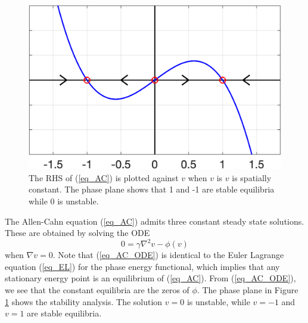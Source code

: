 \documentclass[12pt, reqno]{report}
\theoremstyle{definition}
\theoremstyle{remark}
\begin{document}
\begin{figure}
    \centering
    \vspace{-10pt}
    \includegraphics[width=.3\paperwidth]{media_paper/ACphase.png}
    \caption{The RHS of (\ref{eq_AC}) is plotted against $v$ when $v$ is $v$ is spatially constant. The phase plane shows that 1 and -1 are stable equilibria while 0 is unstable.}
    \label{fg_AC_phase}
\end{figure}
The Allen-Cahn equation (\ref{eq_AC}) admits three constant steady state solutions. These are obtained by solving the ODE 
\begin{equation} \label{eq_AC_ODE}
    0=\gamma\nabla^2v-\phi(v)
\end{equation}
when $\nabla v=0$. 
Note that (\ref{eq_AC_ODE}) is identical to the Euler Lagrange equation (\ref{eq_EL}) for the phase energy functional,
which implies that any stationary energy point is an equilibrium of (\ref{eq_AC}).
From (\ref{eq_AC_ODE}), we see that the constant equilibria are the zeros of $\phi$. 
The phase plane in Figure \ref{fg_AC_phase} shows the stability analysis. 
The solution $v=0$ is unstable, while $v=-1$ and $v=1$ are stable equilibria. 
\end{document}
